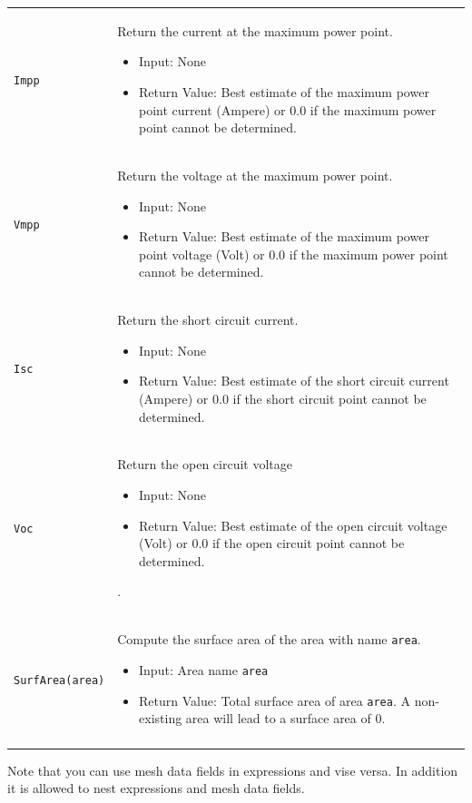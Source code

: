 \documentclass[noshowpacs,preprintnumbers,amsmath,amssymb, letter]{revtex4}
\begin{document}
\begin{longtable}{p{}p{}}
\texttt{Impp}		& Return the current at the maximum power point.
\begin{itemize}
\item Input: None
\item Return Value: Best estimate of the maximum power point current (Ampere) or 0.0 if the maximum power point cannot be determined.
\end{itemize} \\
\texttt{Vmpp}		& Return the voltage at the maximum power point.
\begin{itemize}
\item Input: None
\item Return Value: Best estimate of the maximum power point voltage (Volt) or 0.0 if the maximum power point cannot be determined.
\end{itemize}\\
\texttt{Isc}		& Return the short circuit current.
\begin{itemize}
\item Input: None
\item Return Value: Best estimate of the short circuit current (Ampere) or 0.0 if the short circuit point cannot be determined. 
\end{itemize} \\
\texttt{Voc}		& Return the open circuit voltage
\begin{itemize}
\item Input: None
\item Return Value: Best estimate of the open circuit voltage (Volt) or 0.0 if the open circuit point cannot be determined. 
\end{itemize}. \\
\texttt{SurfArea(area)}		& Compute the surface area of the area with name \texttt{area}.
\begin{itemize}
\item Input: Area name \texttt{area}
\item Return Value: Total surface area of area \texttt{area}. A non-existing area will lead to a surface area of 0.
\end{itemize} \\
\hline
\\
\end{longtable}
Note that you can use mesh data fields in expressions and vise versa. In addition it is allowed to nest expressions and mesh data fields.
\end{document}
